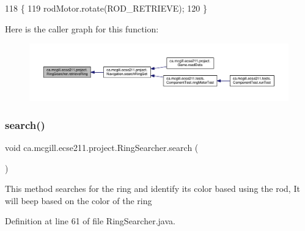 \begin{DoxyCode}
118                              \{
119     rodMotor.rotate(ROD\_RETRIEVE);
120   \}
\end{DoxyCode}
Here is the caller graph for this function\+:\nopagebreak
\begin{figure}[H]
\begin{center}
\leavevmode
\includegraphics[width=350pt]{classca_1_1mcgill_1_1ecse211_1_1project_1_1_ring_searcher_afca3a0c746b07abb88881d926f4fe71f_icgraph}
\end{center}
\end{figure}
\mbox{\label{classca_1_1mcgill_1_1ecse211_1_1project_1_1_ring_searcher_a7ff5756046a0ce992ed8cb8954139c3b}} 
\subsubsection{\texorpdfstring{search()}{search()}}
{\footnotesize\ttfamily void ca.\+mcgill.\+ecse211.\+project.\+Ring\+Searcher.\+search (\begin{DoxyParamCaption}{ }\end{DoxyParamCaption})}

This method searches for the ring and identify its color based using the rod, It will beep based on the color of the ring 

Definition at line 61 of file Ring\+Searcher.\+java.


